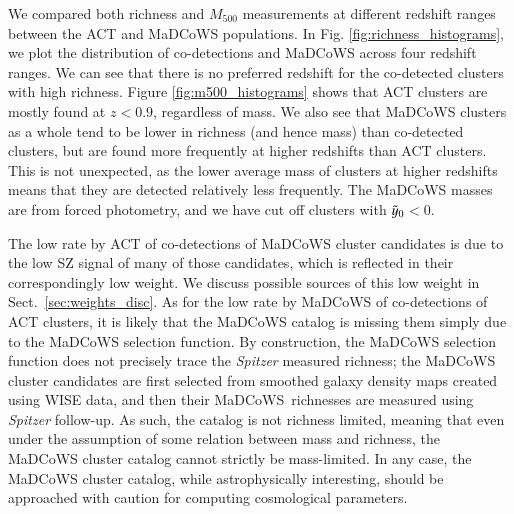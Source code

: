 \documentclass[longauth]{aa} %
\newcommand{\madcows}{MaDCoWS\xspace}
\newcommand{\yc}{$\Tilde{\vary}_0$\xspace}
\begin{document}
We compared both richness and $M_{500}$ measurements at different redshift ranges between the ACT and MaDCoWS populations. In Fig. \ref{fig:richness_histograms}, we plot the distribution of co-detections and MaDCoWS across four redshift ranges. We can see that there is no preferred redshift for the co-detected clusters with high richness. Figure \ref{fig:m500_histograms} shows that ACT clusters are mostly found at $z<0.9$, regardless of mass. We also see that MaDCoWS clusters as a whole tend to be lower in richness (and hence mass) than co-detected clusters, but are found more frequently at higher redshifts than ACT clusters. This is not unexpected, as the lower average mass of clusters at higher redshifts means that they are detected relatively less frequently. The \madcows masses are from forced photometry, and we have cut off clusters with \yc$ < 0$. 

The low rate by ACT of co-detections of \madcows cluster candidates is due to the low SZ signal of many of those candidates, which is reflected in their correspondingly low weight. We discuss possible sources of this low weight in Sect.~\ref{sec:weights_disc}. As for the low rate by \madcows of co-detections of ACT clusters, it is likely that the \madcows catalog is missing them simply due to the \madcows selection function. By construction, the \madcows selection function does not precisely trace the {\it Spitzer} measured richness; the \madcows cluster candidates are first selected from smoothed galaxy density maps created using WISE data, and then their \madcows\ richnesses are measured using {\it Spitzer} follow-up. As such, the catalog is not richness limited, meaning that even under the assumption of some relation between mass and richness, the \madcows cluster catalog cannot strictly be mass-limited. In any case, the \madcows cluster catalog, while astrophysically interesting, should be approached with caution for computing cosmological parameters.

\end{document}
